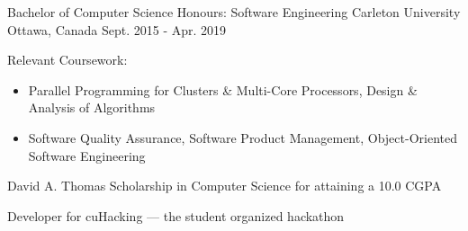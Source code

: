 
\begin{cventries}

  \cventry
    {Bachelor of Computer Science Honours: Software Engineering} %
    {Carleton University} %
    {Ottawa, Canada} %
    {Sept. 2015 - Apr. 2019} %
    {
      \begin{cvitems} %
        \item Relevant Coursework: 
        \begin{itemize}
          \item Parallel Programming for Clusters \& Multi-Core Processors, Design \& Analysis of Algorithms
          \item Software Quality Assurance, Software Product Management, Object-Oriented Software Engineering
        \end{itemize}
        \item David A. Thomas Scholarship in Computer Science for attaining a 10.0 CGPA
        \item Developer for cuHacking --- the student organized hackathon
      \end{cvitems}
    }

\end{cventries}